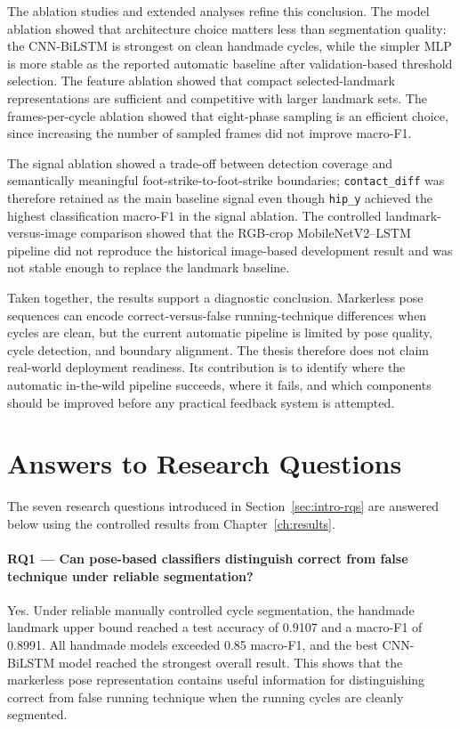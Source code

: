 The ablation studies and extended analyses refine this conclusion. The model
ablation showed that architecture choice matters less than segmentation quality:
the CNN-BiLSTM is strongest on clean handmade cycles, while the simpler MLP is
more stable as the reported automatic baseline after validation-based threshold
selection. The feature ablation showed that compact selected-landmark
representations are sufficient and competitive with larger landmark sets. The
frames-per-cycle ablation showed that eight-phase sampling is an efficient
choice, since increasing the number of sampled frames did not improve macro-F1.

The signal ablation showed a trade-off between detection coverage and
semantically meaningful foot-strike-to-foot-strike boundaries; \texttt{contact\_diff}
was therefore retained as the main baseline signal even though \texttt{hip\_y}
achieved the highest classification macro-F1 in the signal ablation. The
controlled landmark-versus-image comparison showed that the RGB-crop
MobileNetV2--LSTM pipeline did not reproduce the historical image-based
development result and was not stable enough to replace the landmark baseline.

Taken together, the results support a diagnostic conclusion. Markerless pose
sequences can encode correct-versus-false running-technique differences when
cycles are clean, but the current automatic pipeline is limited by pose quality,
cycle detection, and boundary alignment. The thesis therefore does not claim
real-world deployment readiness. Its contribution is to identify where the
automatic in-the-wild pipeline succeeds, where it fails, and which components
should be improved before any practical feedback system is attempted.

\section{Answers to Research Questions}
\label{sec:concl-rqs}

The seven research questions introduced in Section~\ref{sec:intro-rqs} are
answered below using the controlled results from Chapter~\ref{ch:results}.

\paragraph{RQ1 --- Can pose-based classifiers distinguish correct from false
technique under reliable segmentation?}
Yes. Under reliable manually controlled cycle segmentation, the handmade
landmark upper bound reached a test accuracy of 0.9107 and a macro-F1 of
0.8991. All handmade models exceeded 0.85 macro-F1, and the best CNN-BiLSTM
model reached the strongest overall result. This shows that the markerless pose
representation contains useful information for distinguishing correct from
false running technique when the running cycles are cleanly segmented.


